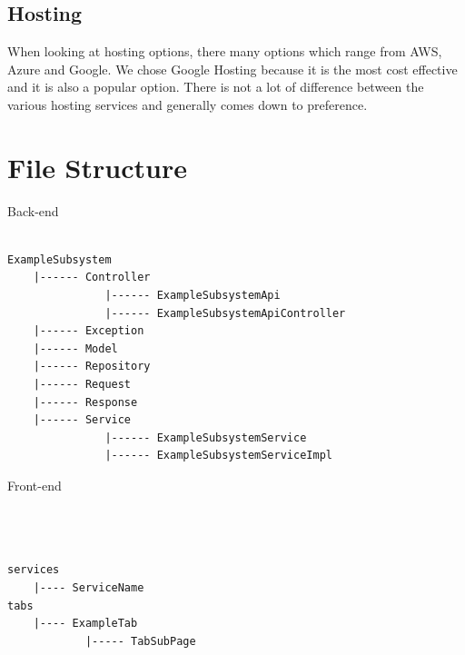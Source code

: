 \documentclass[hidelinks, 12pt, a4paper]{article}
\begin{document}
\subsection{Hosting}
When looking at hosting options, there many options which range from AWS, Azure and Google.
We chose Google Hosting because it is the most cost effective and it is also a popular option.
There is not a lot of difference between the various hosting services and generally comes down to preference.
\newpage

\section{File Structure}
Back-end
    
        \begin{lstlisting}

ExampleSubsystem
    |------ Controller
               |------ ExampleSubsystemApi
               |------ ExampleSubsystemApiController
    |------ Exception
    |------ Model
    |------ Repository
    |------ Request
    |------ Response
    |------ Service
               |------ ExampleSubsystemService
               |------ ExampleSubsystemServiceImpl
        \end{lstlisting}
            
        Front-end
    
        \begin{lstlisting}
        


services
    |---- ServiceName
tabs
    |---- ExampleTab
            |----- TabSubPage
        \end{lstlisting}
            
\end{document}
